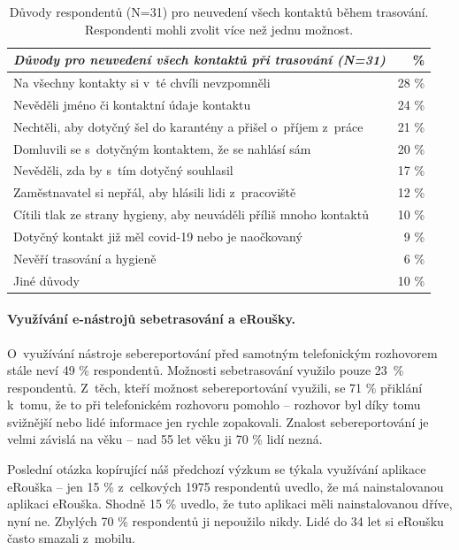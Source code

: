 \begin{table}
\begin{center}
\begin{tabular}{|l|r|}
\hline
\emph{Důvody pro neuvedení všech kontaktů při trasování (N=31)} &  \% \\
\hline \hline
Na všechny kontakty si v~té chvíli nevzpomněli & 28 \% \\
Nevěděli jméno či kontaktní údaje kontaktu & 24 \% \\
Nechtěli, aby dotyčný šel do karantény a přišel o~příjem z~práce & 21 \% \\
Domluvili se s~dotyčným kontaktem, že se nahlásí sám & 20 \% \\
Nevěděli, zda by s~tím dotyčný souhlasil & 17 \% \\
Zaměstnavatel si nepřál, aby hlásili lidi z~pracoviště & 12 \% \\
Cítili tlak ze strany hygieny, aby neuváděli příliš mnoho kontaktů & 10 \% \\
Dotyčný kontakt již měl covid-19 nebo je naočkovaný & 9 \% \\
Nevěří trasování a hygieně & 6 \% \\
Jiné důvody & 10 \% \\
\hline
\end{tabular}
\end{center}
\caption{Důvody respondentů (N=31) pro neuvedení všech kontaktů během trasování. Respondenti mohli zvolit více než jednu možnost.}
\end{table}

\paragraph*{Využívání e-nástrojů sebetrasování a eRoušky.}
O~využívání nástroje sebereportování před samotným telefonickým rozhovorem stále neví 49 \% respondentů. Možnosti sebetrasování využilo pouze  23~\% respondentů. Z~těch, kteří možnost sebereportování využili, se 71 \% přiklání k~tomu, že to při telefonickém rozhovoru pomohlo -- rozhovor byl díky tomu svižnější nebo lidé informace jen rychle zopakovali. Znalost sebereportování je velmi závislá na věku -- nad 55 let věku ji 70 \% lidí nezná. 

Poslední otázka kopírující náš předchozí výzkum se týkala využívání aplikace eRouška -- jen 15 \% z~celkových 1975 respondentů uvedlo, že má nainstalovanou aplikaci eRouška. Shodně 15 \% uvedlo, že tuto aplikaci měli nainstalovanou dříve, nyní ne. Zbylých 70 \% respondentů ji nepoužilo nikdy. Lidé do 34 let si eRoušku často smazali z~mobilu. 

